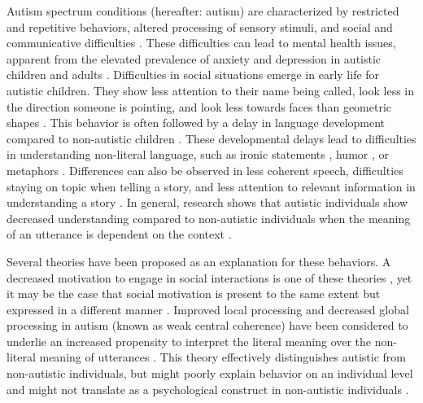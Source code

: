 Autism spectrum conditions (hereafter: autism) are characterized by restricted and repetitive behaviors, altered processing of sensory stimuli, and social and communicative difficulties \citep{apa2013}. These difficulties can lead to mental health issues, apparent from the elevated prevalence of anxiety and depression in autistic children and adults \citep{hollocks2019,lai2019,vasa2020}. Difficulties in social situations emerge in early life for autistic children. They show less attention to their name being called, look less in the direction someone is pointing, and look less towards faces than geometric shapes \citep{goldberg2005,osterling2002,pierce2011}. This behavior is often followed by a delay in language development compared to non-autistic children \citep{kim2014}. These developmental delays lead to difficulties in understanding non-literal language, such as ironic statements \citep{wang2006,deliens2018}, humor \citep{ozonoff1996}, or metaphors \citep{rundblad2010}. Differences can also be observed in less coherent speech, difficulties staying on topic when telling a story, and less attention to relevant information in understanding a story \citep{diehl2006,volden2002,yingsng2018}. In general, research shows that autistic individuals show decreased understanding compared to non-autistic individuals when the meaning of an utterance is dependent on the context \citep{angeleri2016,happe1997,loukusa2007,wadge2019}. 

Several theories have been proposed as an explanation for these behaviors. A decreased motivation to engage in social interactions is one of these theories \citep{chevallier2012}, yet it may be the case that social motivation is present to the same extent but expressed in a different manner \citep{escalona2002}. Improved local processing and decreased global processing in autism (known as weak central coherence) have been considered to underlie an increased propensity to interpret the literal meaning over the non-literal meaning of utterances \citep{happe1997}. This theory effectively distinguishes autistic from non-autistic individuals, but might poorly explain behavior on an individual level \citep{pellicano2006} and might not translate as a psychological construct in non-autistic individuals \citep{pellicano2005}. 

